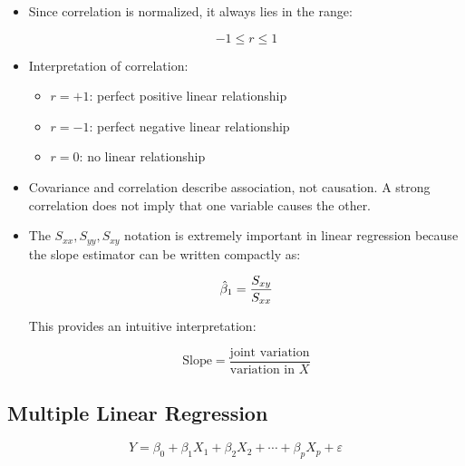 \documentclass[10pt,a4paper]{article}
\begin{document}
\begin{itemize}
		\begin{equation*}
			\Large
			r
			=
			\frac{cov(X,Y)}
			{\sqrt{var(X)var(Y)}}
		\end{equation*}
	
		Using the \(S\)-notation:
	
		\begin{equation*}
			\Large
			r
			=
			\frac{S_{xy}}
			{\sqrt{S_{xx}S_{yy}}}
		\end{equation*}
	
		\item Since correlation is normalized, it always lies in the range:
	
		\[
		-1 \le r \le 1
		\]
	
		\item Interpretation of correlation:
	
		\begin{itemize}
			\item \(r = +1\): perfect positive linear relationship
			\item \(r = -1\): perfect negative linear relationship
			\item \(r = 0\): no linear relationship
		\end{itemize}
	
		\item Covariance and correlation describe association, not causation.
		A strong correlation does not imply that one variable causes the other.
	
		\item The \(S_{xx}, S_{yy}, S_{xy}\) notation is extremely important in linear regression because the slope estimator can be written compactly as:
	
		\begin{equation*}
			\Large
			\hat{\beta}_1
			=
			\frac{S_{xy}}{S_{xx}}
		\end{equation*}
	
		This provides an intuitive interpretation:
	
		\[
		\text{Slope}
		=
		\frac{\text{joint variation}}
		{\text{variation in } X}
		\]
	
	\end{itemize}


	\subsection{Multiple Linear Regression}
	 \[
		Y = \beta_0 + \beta_1 X_1 + \beta_2 X_2 + \cdots + \beta_p X_p + \varepsilon
	\]
\end{document}
